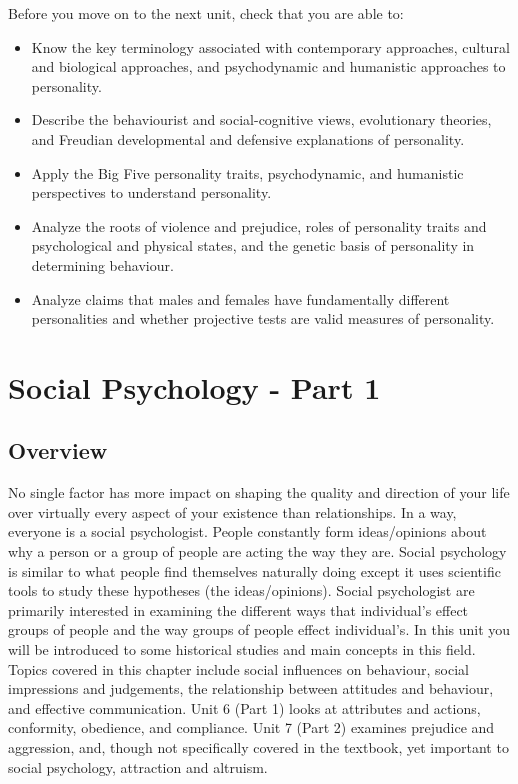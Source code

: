 \documentclass[
]{book}
\providecommand{\tightlist}{%
  \setlength{\itemsep}{0pt}\setlength{\parskip}{0pt}}
\begin{document}
\begin{progress}
Before you move on to the next unit, check that you are able to:

\begin{itemize}
\tightlist
\item
  Know the key terminology associated with contemporary approaches, cultural and biological approaches, and psychodynamic and humanistic approaches to personality.\\
\item
  Describe the behaviourist and social-cognitive views, evolutionary theories, and Freudian developmental and defensive explanations of personality.\\
\item
  Apply the Big Five personality traits, psychodynamic, and humanistic perspectives to understand personality.\\
\item
  Analyze the roots of violence and prejudice, roles of personality traits and psychological and physical states, and the genetic basis of personality in determining behaviour.\\
\item
  Analyze claims that males and females have fundamentally different personalities and whether projective tests are valid measures of personality.
\end{itemize}
\end{progress}

\hypertarget{social-psychology---part-1}{%
\chapter{Social Psychology - Part 1}\label{social-psychology---part-1}}

\hypertarget{overview-5}{%
\section*{Overview}\label{overview-5}}

No single factor has more impact on shaping the quality and direction of your life over virtually every aspect of your existence than relationships. In a way, everyone is a social psychologist. People constantly form ideas/opinions about why a person or a group of people are acting the way they are. Social psychology is similar to what people find themselves naturally doing except it uses scientific tools to study these hypotheses (the ideas/opinions). Social psychologist are primarily interested in examining the different ways that individual's effect groups of people and the way groups of people effect individual's. In this unit you will be introduced to some historical studies and main concepts in this field. Topics covered in this chapter include social influences on behaviour, social impressions and judgements, the relationship between attitudes and behaviour, and effective communication. Unit 6 (Part 1) looks at attributes and actions, conformity, obedience, and compliance. Unit 7 (Part 2) examines prejudice and aggression, and, though not specifically covered in the textbook, yet important to social psychology, attraction and altruism.
\end{document}
